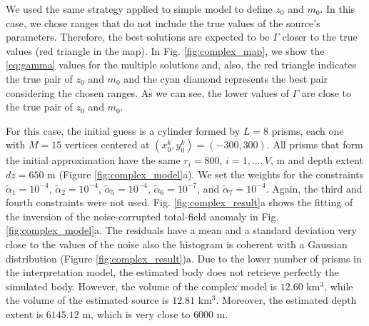 We used the same strategy applied to simple model to define $z_0$ and $ m_0 $. In this case, we chose ranges that do not include the true values of the source's parameters. Therefore, the best solutions are expected to be $\Gamma$ closer to the true values (red triangle in the map). In Fig. \ref{fig:complex_map}, we show the \ref{eq:gamma} values for the multiple solutions and, also, the red triangle indicates the true pair of $z_0$ and $ m_0 $ and the cyan diamond represents the best pair considering the chosen ranges. As we can see, the lower values of $\Gamma$ are close to the true pair of $z_0$ and $ m_0 $.

For this case, the initial guess is a cylinder formed by $L=8$ prisms, each one with $M=15$ vertices centered at $(x_0^k, y_0^k) = (-300,300)$. All prisms that form the initial approximation have the same $r_i = 800$, $i = 1, \dots, V$, m and depth extent $dz=650$ m (Figure \ref{fig:complex_model}a). We set the weights for the constraints $\tilde{\alpha}_1 = 10^{-4}$, $\tilde{\alpha}_2 = 10^{-4}$, $\tilde{\alpha}_5 = 10^{-4}$, $\tilde{\alpha}_6 = 10^{-7}$, and $\tilde{\alpha}_7 = 10^{-4}$. Again, the third and fourth constraints were not used. Fig. \ref{fig:complex_result}a shows the fitting of the inversion of the noise-corrupted total-field anomaly in Fig. \ref{fig:complex_model}a. The residuals have a mean and a standard deviation very close to the values of the noise also the histogram is coherent with a Gaussian distribution (Figure \ref{fig:complex_result})a. Due to the lower number of prisms in the interpretation model, the estimated body does not retrieve perfectly the simulated body. However, the volume of the complex model is $12.60$ km$^3$, while the volume of the estimated source is $12.81$ km$^3$. Moreover, the estimated depth extent is $6145.12$ m, which is very close to $6000$ m. 


